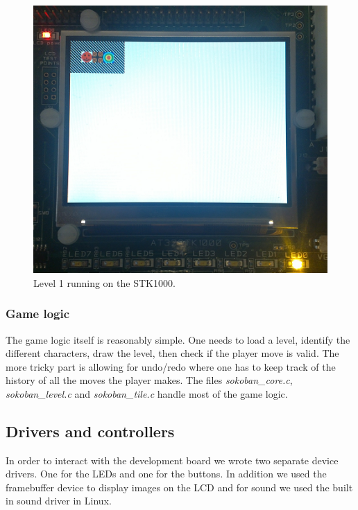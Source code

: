 \documentclass[a4paper,11pt]{article}
\begin{document}
\begin{figure}[H]
\centering
\includegraphics[scale=0.5]{images/level1.png}
\caption{Level 1 running on the STK1000.}
\label{fig:level1}
\end{figure}

\subsubsection{Game logic}
The game logic itself is reasonably simple. One needs to load a level, identify the different characters, draw the level, then check if the player move is valid. The more tricky part is allowing for undo/redo where one has to keep track of the history of all the moves the player makes. The files \textit{sokoban\_core.c}, \textit{sokoban\_level.c} and \textit{sokoban\_tile.c} handle most of the game logic.

\subsection{Drivers and controllers}
\label{sec:driversandcontrollers}
In order to interact with the development board we wrote two separate device drivers. One for the LEDs and one for the buttons. In addition we used the framebuffer device to display images on the LCD and for sound we used the built in sound driver in Linux.
\end{document}
